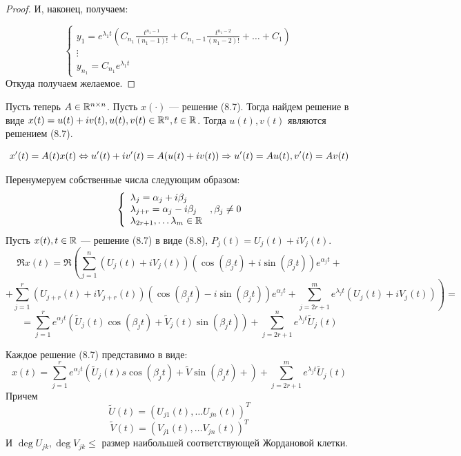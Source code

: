 \begin{proof}
    И, наконец, получаем:

    \begin{equation*}
        \begin{cases*}
            y_1 = e^{\lambda_1t}\left( C_{n_1}\frac{t^{n_1 - 1}}{(n_1 - 1)!} +  C_{n_1 - 1}\frac{t^{n_1 - 2}}{(n_1 - 2)!} + \dots + C_1 \right) \\
            \vdots \\
            y_{n_1} = C_{n_1}e^{\lambda_1 t}
        \end{cases*}
    \end{equation*}
    Откуда получаем желаемое.
\end{proof}

Пусть теперь \(A \in \mathbb{R}^{n \times n}\). Пусть \(x(\cdot)\) --- решение (8.7). Тогда найдем решение в виде \(x(t) = u(t) + iv(t), u(t), v(t) \in \mathbb{R}^n, t \in \mathbb{R}\). Тогда \(u(t), v(t)\) являются решением (8.7).

\[x'(t) = A(t)x(t) \Leftrightarrow u'(t) + iv'(t) = A(u(t) + iv(t)) \Rightarrow u'(t) = Au(t), v'(t) = Av(t)\]

Перенумеруем собственные числа следующим образом:
\[\left\{\begin{array}{l}
    \lambda_j = \alpha_j + i\beta_j\\
    \lambda_{j + r} = \alpha_j - i\beta_j \\
    \lambda_{2r + 1}, \dots \lambda_m \in \mathbb{R} \\
\end{array}\right., \beta_j \ne 0\]
Пусть \(x(t), t \in \mathbb{R}\) --- решение (8.7) в виде (8.8), \(P_j(t) = U_j(t) + iV_j(t)\).
\[\Re x(t) = \Re \left( \sum_{j = 1}^n (U_j(t) + iV_j(t))(\cos(\beta_jt) + i\sin(\beta_jt))e^{\alpha_jt} \right. +\]
\[\left.+ \sum_{j = 1}^r(U_{j + r}(t) + iV_{j + r}(t))(\cos (\beta_jt) - i\sin(\beta_jt))e^{\alpha_jt} + \sum_{j = 2r + 1}^m e^{\lambda_jt}(U_j(t) + iV_j(t))\right) = \]
\[= \sum_{j = 1}^re^{\alpha_jt}\left( \tilde{U}_j(t) \cos(\beta_jt) + \tilde{V}_j(t)\sin(\beta_jt) \right) + \sum_{j = 2r + 1}^ne^{\lambda_jt}\tilde{U}_j(t)\]

\begin{corollary}
    Каждое решение (8.7) представимо в виде:
    \[x(t) = \sum_{j = 1}^re^{\alpha_jt}\left( \tilde{U}_j(t)s\cos(\beta_jt) + \tilde{V}\sin(\beta_jt) +  \right) + \sum_{j = 2r + 1}^m e^{\lambda_jt}\tilde{U}_j(t)\]
    Причем 
    \[\tilde{U}(t) = (U_{j1}(t), \dots U_{jn}(t))^T\]
    \[\tilde{V}(t) = (V_{j1}(t), \dots V_{jn}(t))^T\]
    И \(\deg U_{jk}, \deg V_{jk} \le\) размер наибольшей соответствующей Жордановой клетки.
\end{corollary}

